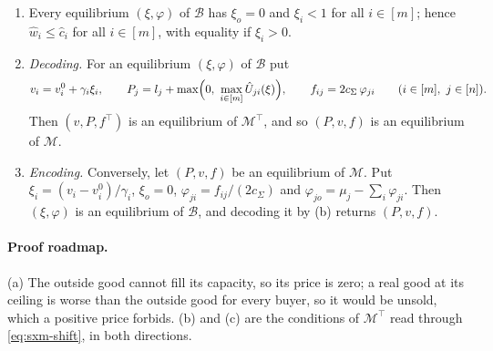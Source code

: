 \begin{lemma}\label{lem:sxm-bounded}
\begin{enumerate}[nosep,label=(\alph*)]
\item Every equilibrium $(\xi,\varphi)$ of $\mathcal B$ has $\xi_o=0$ and $\xi_i<1$ for all $i\in[m]$; hence
$\hat w_i\le\hat c_i$ for all $i\in[m]$, with equality if $\xi_i>0$.
\item \emph{Decoding.} For an equilibrium $(\xi,\varphi)$ of $\mathcal B$ put
\[
v_i=v_i^0+\gamma_i\xi_i,\qquad P_j=l_j+\max\Bigl(0,\ \max_{i\in[m]}\hat U_{ji}(\xi)\Bigr),\qquad
f_{ij}=2c_\Sigma\,\varphi_{ji}\qquad(i\in[m],\ j\in[n]).
\]
Then $(v,P,f^\top)$ is an equilibrium of $\mathcal M^\top$, and so $(P,v,f)$ is an equilibrium of
$\mathcal M$.
\item \emph{Encoding.} Conversely, let $(P,v,f)$ be an equilibrium of $\mathcal M$. Put
$\xi_i=(v_i-v_i^0)/\gamma_i$, $\xi_o=0$, $\varphi_{ji}=f_{ij}/(2c_\Sigma)$ and
$\varphi_{jo}=\mu_j-\sum_i\varphi_{ji}$. Then $(\xi,\varphi)$ is an equilibrium of $\mathcal B$, and
decoding it by (b) returns $(P,v,f)$.
\end{enumerate}
\end{lemma}

\paragraph{Proof roadmap.} (a) The outside good cannot fill its capacity, so its price is zero; a real
good at its ceiling is worse than the outside good for every buyer, so it would be unsold, which a
positive price forbids. (b) and (c) are the conditions of $\mathcal M^\top$ read through
\eqref{eq:sxm-shift}, in both directions.

